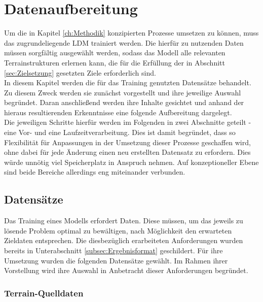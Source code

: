 \chapter{Datenaufbereitung}
\label{ch:Datenaufbereitung}

Um die in Kapitel \ref{ch:Methodik} konzipierten Prozesse umsetzen zu können, muss das zugrundeliegende \ac{LDM} trainiert werden. Die hierfür zu nutzenden Daten müssen sorgfältig ausgewählt werden, sodass das Modell alle relevanten Terrainstrukturen erlernen kann, die für die Erfüllung der in Abschnitt \ref{sec:Zielsetzung} gesetzten Ziele erforderlich sind. \\
In diesem Kapitel werden die für das Training genutzten Datensätze behandelt. Zu diesem Zweck werden sie zunächst vorgestellt und ihre jeweilige Auswahl begründet. Daran anschließend werden ihre Inhalte gesichtet und anhand der hieraus resultierenden Erkenntnisse eine folgende Aufbereitung dargelegt. \\
Die jeweiligen Schritte hierfür werden im Folgenden in zwei Abschnitte geteilt - eine Vor- und eine Laufzeitverarbeitung. Dies ist damit begründet, dass so Flexibilität für Anpassungen in der Umsetzung dieser Prozesse geschaffen wird, ohne dabei für jede Änderung einen neu erstellten Datensatz zu erfordern. Dies würde unnötig viel Speicherplatz in Anspruch nehmen. Auf konzeptioneller Ebene sind beide Bereiche allerdings eng miteinander verbunden.

\section{Datensätze}

Das Training eines Modells erfordert Daten. Diese müssen, um das jeweils zu lösende Problem optimal zu bewältigen, nach Möglichkeit den erwarteten Zieldaten entsprechen. Die diesbezüglich erarbeiteten Anforderungen wurden bereits in Unterabschnitt \ref{subsec:Ergebnisformat} geschildert. Für ihre Umsetzung wurden die folgenden Datensätze gewählt. Im Rahmen ihrer Vorstellung wird ihre Auswahl in Anbetracht dieser Anforderungen begründet.

\subsection{Terrain-Quelldaten}

